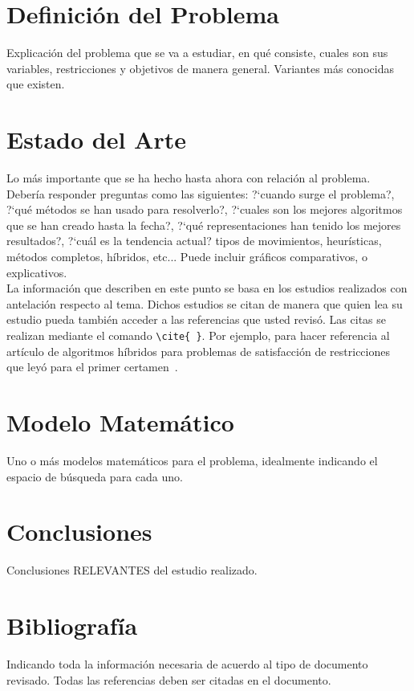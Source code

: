 \documentclass[letter, 10pt]{article}
\begin{document}
\section{Definici\'on del Problema}
Explicaci\'on del problema que se va a estudiar, en qu\'e consiste, cuales son sus variables, restricciones y objetivos de manera general.
Variantes m\'as conocidas que existen.

\section{Estado del Arte}
Lo m\'as importante que se ha hecho hasta ahora con relaci\'on al problema. Deber\'ia responder preguntas como las siguientes:
?`cuando surge el problema?, ?`qu\'e m\'etodos se han usado para resolverlo?, ?`cuales son los mejores algoritmos que se han creado hasta
la fecha?, ?`qu\'e representaciones han tenido los mejores resultados?, ?`cu\'al es la tendencia actual? tipos de movimientos,
heur\'isticas, m\'etodos completos, h\'ibridos, etc... Puede incluir gr\'aficos comparativos, o explicativos.\\
La informaci\'on que describen en este punto se basa en los estudios realizados con antelaci\'on respecto al tema.
Dichos estudios se citan de manera que quien lea su estudio pueda tambi\'en
 acceder a las referencias que usted revis\'o. Las citas se realizan mediante el comando \verb+\cite{ }+.
Por ejemplo, para hacer referencia al art\'iculo de algoritmos h\'ibridos para problemas de satisfacci\'on 
 de restricciones que ley\'o para el primer certamen~\cite{Prosser93Hybrid}.

\section{Modelo Matem\'atico}
Uno o m\'as modelos matem\'aticos para el problema, idealmente indicando el espacio de b\'usqueda para cada uno.

\section{Conclusiones}
Conclusiones RELEVANTES del estudio realizado.

\section{Bibliograf\'ia}
Indicando toda la informaci\'on necesaria de acuerdo al tipo de documento revisado. Todas las referencias deben ser 
citadas en el documento.


\end{document}

